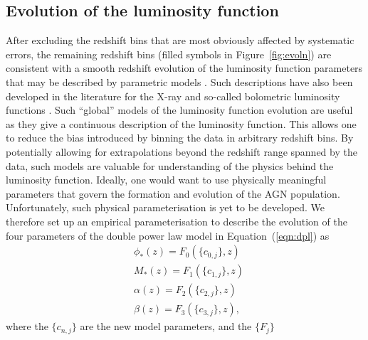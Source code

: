 \documentclass[fleqn,usenatbib]{mnras}
\begin{document}

\subsection{Evolution of the luminosity function}
\label{sec:global}

After excluding the redshift bins that are most obviously affected by
systematic errors, the remaining redshift bins (filled symbols in
Figure~\ref{fig:evoln}) are consistent with a smooth redshift
evolution of the luminosity function parameters that may be described
by parametric models \citep{1976A&A....53...15M, 1983ApJ...269..352S,
  1988ApJ...325...92K, 1988MNRAS.235..935B, 1993ApJ...406L..43H,
  1994ApJ...421..412W, 1995AJ....110...68S, 1995AJ....110.2553K,
  1995ApJ...438..623P, 2000MNRAS.317.1014B, 2001AJ....121...54F,
  2006AJ....131.2766R, 2007A&A...472..443B, 2009MNRAS.399.1755C,
  2013ApJ...773...14R, 2013A&A...551A..29P}.  Such descriptions have
also been developed in the literature for the X-ray
\citep[e.g.,][]{2015MNRAS.451.1892A} and so-called bolometric
luminosity functions \citep[e.g.,][]{2007ApJ...654..731H}.  Such
``global'' models of the luminosity function evolution are useful as
they give a continuous description of the luminosity function.  This
allows one to reduce the bias introduced by binning the data in
arbitrary redshift bins.  By potentially allowing for extrapolations
beyond the redshift range spanned by the data, such models are
valuable for understanding of the physics behind the luminosity
function.  Ideally, one would want to use physically meaningful
parameters that govern the formation and evolution of the AGN
population.  Unfortunately, such physical parameterisation is yet to
be developed.  We therefore set up an empirical parameterisation to
describe the evolution of the four parameters of the double power law
model in Equation~(\ref{eqn:dpl}) as 
\begin{align}
  &\phi_*(z) = F_0(\{c_{0,j}\}, z)\nonumber\\
  &M_*(z) = F_1(\{c_{1,j}\}, z)\nonumber\\
  &\alpha(z) = F_2(\{c_{2,j}\}, z)\nonumber\\
  &\beta(z) = F_3(\{c_{3,j}\}, z),
  \label{eqn:global}
\end{align}
where the $\{c_{n,j}\}$ are the new model parameters, and the $\{F_j\}$
\end{document}
